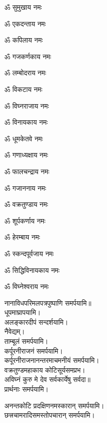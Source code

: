 \begin{enumerate}%
\begin{minipage}{0.475\linewidth}   
\item ॐ सुमुखाय नमः
\item ॐ एकदन्ताय नमः
\item ॐ कपिलाय नमः
\item ॐ गजकर्णकाय नमः
\item ॐ लम्बोदराय नमः
\item ॐ विकटाय नमः
\item ॐ विघ्नराजाय नमः
\item ॐ विनायकाय नमः
\item ॐ धूमकेतवे नमः
  \end{minipage}
  \begin{minipage}{0.525\linewidth}
\item ॐ गणाध्यक्षाय नमः
\item ॐ फालचन्द्राय नमः
\item ॐ गजाननाय नमः
\item ॐ वक्रतुण्डाय नमः
\item ॐ शूर्पकर्णाय नमः
\item ॐ हेरम्बाय नमः
\item ॐ स्कन्दपूर्वजाय नमः
\item ॐ सिद्धिविनायकाय नमः
\item ॐ विघ्नेश्वराय नमः
  \end{minipage}
\end{enumerate}
नानाविधपरिमलपत्रपुष्पाणि समर्पयामि॥\\
धूपमाघ्रापयामि।\\
अलङ्कारदीपं सन्दर्शयामि।\\
नैवेद्यम्।\\
ताम्बूलं समर्पयामि।\\
कर्पूरनीराजनं समर्पयामि।\\
कर्पूरनीराजनानन्तरमाचमनीयं समर्पयामि।\\
{वक्रतुण्डमहाकाय कोटिसूर्यसमप्रभ।}\\
{अविघ्नं कुरु मे देव सर्वकार्येषु सर्वदा॥}\\
प्रार्थनाः समर्पयामि।

अनन्तकोटि प्रदक्षिणनमस्कारान् समर्पयामि।\\
छत्त्रचामरादिसमस्तोपचारान् समर्पयामि।\\


